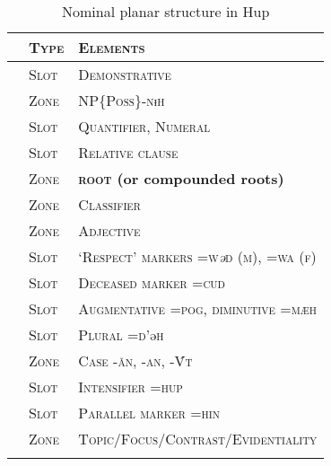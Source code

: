 \documentclass[output=paper]{langscibook}
\begin{document}
\begin{table}[htp]
    \caption{Nominal planar structure in Hup}
    \label{tab:hup:key:2}
    \centering
    \begin{tabular}{Tll} 
    \lsptoprule
      & \textsc{Type} & \textsc{Elements}\\ \midrule
\label{hup01n} & \textsc{Slot} & \textsc{Demonstrative}\\
\label{hup02n} & \textsc{Zone} & \textsc{NP\{Poss\}-nɨh}\\
\label{hup03n} & \textsc{Slot} & \textsc{Quantifier,} \textsc{Numeral} \\
\label{hup04n} & \textsc{Slot} & \textsc{Relative} \textsc{clause}\\
\label{hup05n} & \textsc{Zone} & \textbf{\textsc{root} \textbf{(or} \textbf{compounded} \textbf{roots)}}\\
\label{hup06n} & \textsc{Zone} & \textsc{Classifier}\\
\label{hup07n} & \textsc{Zone} & \textsc{Adjective}\\
\label{hup08n} & \textsc{Slot} & \textsc{`Respect'} \textsc{markers} \textsc{=w}\textit{ǝ}\textsc{d} \textsc{(m),} \textsc{=wa} \textsc{(f)}\\
\label{hup09n} & \textsc{Slot} & \textsc{Deceased} \textsc{marker} \textsc{=cud}\\
\label{hup10n} & \textsc{Slot} & \textsc{Augmentative} \textsc{=pog,} \textsc{diminutive} \textsc{=mæh}\\
\label{hup11n} & \textsc{Slot} & \textsc{Plural} \textsc{=d'}ǝ\textsc{h}\\
\label{hup12n} & \textsc{Zone} & \textsc{Case} \textsc{-ăn,} \textsc{-an,} \textsc{-\'{V}t}\\
\label{hup13n} & \textsc{Slot} & \textsc{Intensifier} \textsc{=hup}\\
\label{hup14n} & \textsc{Slot} & \textsc{Parallel} \textsc{marker} \textsc{=hin}\\
\label{hup15n} & \textsc{Zone} & \textsc{Topic/Focus/Contrast/Evidentiality}\\
\lspbottomrule
    \end{tabular}
\end{table}
\end{document}
